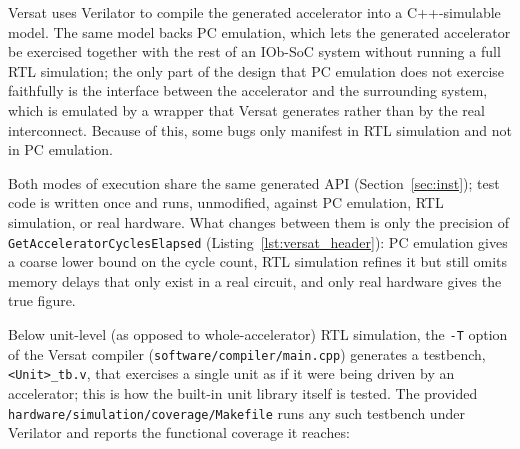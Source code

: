 %

Versat uses Verilator to compile the generated accelerator into a
C++-simulable model. The same model backs PC emulation, which lets the
generated accelerator be exercised together with the rest of an IOb-SoC
system without running a full RTL simulation; the only part of the design
that PC emulation does not exercise faithfully is the interface between
the accelerator and the surrounding system, which is emulated by a wrapper
that Versat generates rather than by the real interconnect. Because of
this, some bugs only manifest in RTL simulation and not in PC emulation.

Both modes of execution share the same generated API
(Section~\ref{sec:inst}); test code is written once and runs, unmodified,
against PC emulation, RTL simulation, or real hardware. What changes
between them is only the precision of \texttt{GetAcceleratorCyclesElapsed}
(Listing~\ref{lst:versat_header}): PC emulation gives a coarse lower bound
on the cycle count, RTL simulation refines it but still omits memory
delays that only exist in a real circuit, and only real hardware gives the
true figure.

Below unit-level (as opposed to whole-accelerator) RTL simulation, the
\texttt{-T} option of the Versat compiler
(\texttt{software/\allowbreak compiler/\allowbreak main.cpp}) generates a
testbench, \texttt{<Unit>\_tb.v}, that exercises a single unit as if it
were being driven by an accelerator; this is how the built-in unit
library itself is tested. The provided
\texttt{hardware/\allowbreak simulation/\allowbreak coverage/\allowbreak Makefile}
runs any such testbench under Verilator and reports the functional
coverage it reaches:


